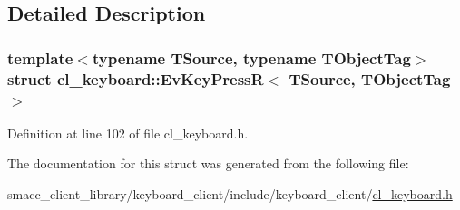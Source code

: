 \subsection{Detailed Description}
\subsubsection*{template$<$typename T\+Source, typename T\+Object\+Tag$>$\newline
struct cl\+\_\+keyboard\+::\+Ev\+Key\+Press\+R$<$ T\+Source, T\+Object\+Tag $>$}



Definition at line 102 of file cl\+\_\+keyboard.\+h.



The documentation for this struct was generated from the following file\+:\begin{DoxyCompactItemize}
\item 
smacc\+\_\+client\+\_\+library/keyboard\+\_\+client/include/keyboard\+\_\+client/\hyperlink{cl__keyboard_8h}{cl\+\_\+keyboard.\+h}\end{DoxyCompactItemize}
